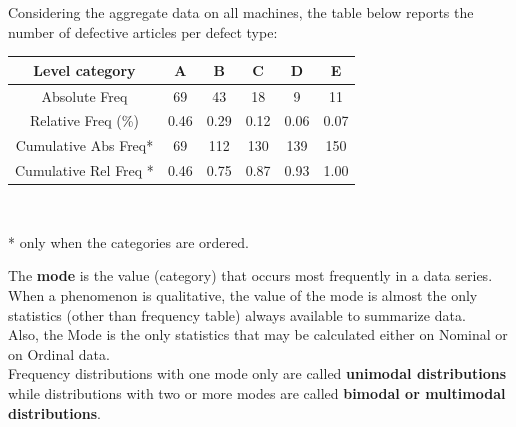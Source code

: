 \begin{frame}
  \vspace{0.75cm}
  Considering the aggregate data on all machines, the table below reports the number of defective articles per defect type:
  \vspace{0.75cm}
  \begin{center}
    \begin{tabular}{|*{6}{c|}}
      \hline
      \textbf{Level category}  & \textbf{A} & \textbf{B} & \textbf{C} & \textbf{D} & \textbf{E} \\
      \hline
      Absolute Freq &69&43&18&9&11  \\
      \hline
      Relative Freq (\%) & 0.46 &0.29 & 0.12& 0.06& 0.07\\
      \hline
      Cumulative Abs Freq*& 69& 112 &130&139& 150\\
      \hline
      Cumulative Rel Freq *& 0.46 &0.75 & 0.87 &0.93& 1.00 \\
      \hline
    \end{tabular}\\
  \end{center}
  * only when the categories are ordered.
\end{frame}


\begin{frame}
    \vspace{.35cm}
    The \textbf{mode} is the value (category) that occurs most frequently in a data series.\\
    \vspace{.35cm}
    When a phenomenon is qualitative, the value of the mode is almost the only statistics (other than frequency table) always available to summarize data.\\
    \vspace{.35cm}
    Also, the Mode is the only statistics that may be calculated either on Nominal or on Ordinal data.\\
    \vspace{.3cm}
    Frequency distributions with one mode only are called \textbf{unimodal distributions} while distributions with two or more modes are called \textbf{bimodal or multimodal distributions}.\\
    \vspace{.3cm}
\end{frame}

